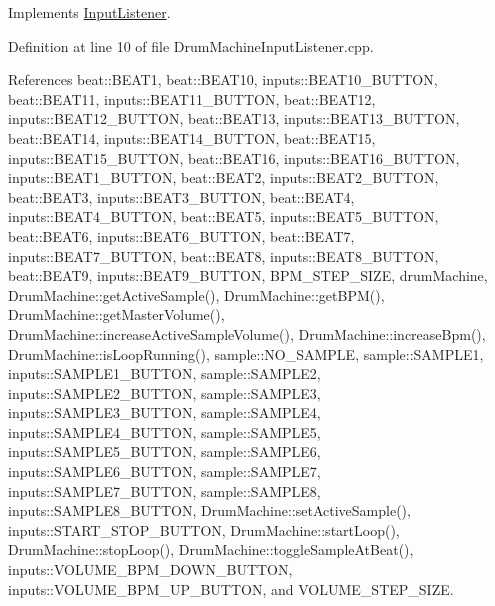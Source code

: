 Implements \hyperlink{class_input_listener_a1a3d74f2ffc108c773511ea4be250f7d}{Input\+Listener}.



Definition at line 10 of file Drum\+Machine\+Input\+Listener.\+cpp.



References beat\+::\+B\+E\+A\+T1, beat\+::\+B\+E\+A\+T10, inputs\+::\+B\+E\+A\+T10\+\_\+\+B\+U\+T\+T\+ON, beat\+::\+B\+E\+A\+T11, inputs\+::\+B\+E\+A\+T11\+\_\+\+B\+U\+T\+T\+ON, beat\+::\+B\+E\+A\+T12, inputs\+::\+B\+E\+A\+T12\+\_\+\+B\+U\+T\+T\+ON, beat\+::\+B\+E\+A\+T13, inputs\+::\+B\+E\+A\+T13\+\_\+\+B\+U\+T\+T\+ON, beat\+::\+B\+E\+A\+T14, inputs\+::\+B\+E\+A\+T14\+\_\+\+B\+U\+T\+T\+ON, beat\+::\+B\+E\+A\+T15, inputs\+::\+B\+E\+A\+T15\+\_\+\+B\+U\+T\+T\+ON, beat\+::\+B\+E\+A\+T16, inputs\+::\+B\+E\+A\+T16\+\_\+\+B\+U\+T\+T\+ON, inputs\+::\+B\+E\+A\+T1\+\_\+\+B\+U\+T\+T\+ON, beat\+::\+B\+E\+A\+T2, inputs\+::\+B\+E\+A\+T2\+\_\+\+B\+U\+T\+T\+ON, beat\+::\+B\+E\+A\+T3, inputs\+::\+B\+E\+A\+T3\+\_\+\+B\+U\+T\+T\+ON, beat\+::\+B\+E\+A\+T4, inputs\+::\+B\+E\+A\+T4\+\_\+\+B\+U\+T\+T\+ON, beat\+::\+B\+E\+A\+T5, inputs\+::\+B\+E\+A\+T5\+\_\+\+B\+U\+T\+T\+ON, beat\+::\+B\+E\+A\+T6, inputs\+::\+B\+E\+A\+T6\+\_\+\+B\+U\+T\+T\+ON, beat\+::\+B\+E\+A\+T7, inputs\+::\+B\+E\+A\+T7\+\_\+\+B\+U\+T\+T\+ON, beat\+::\+B\+E\+A\+T8, inputs\+::\+B\+E\+A\+T8\+\_\+\+B\+U\+T\+T\+ON, beat\+::\+B\+E\+A\+T9, inputs\+::\+B\+E\+A\+T9\+\_\+\+B\+U\+T\+T\+ON, B\+P\+M\+\_\+\+S\+T\+E\+P\+\_\+\+S\+I\+ZE, drum\+Machine, Drum\+Machine\+::get\+Active\+Sample(), Drum\+Machine\+::get\+B\+P\+M(), Drum\+Machine\+::get\+Master\+Volume(), Drum\+Machine\+::increase\+Active\+Sample\+Volume(), Drum\+Machine\+::increase\+Bpm(), Drum\+Machine\+::is\+Loop\+Running(), sample\+::\+N\+O\+\_\+\+S\+A\+M\+P\+LE, sample\+::\+S\+A\+M\+P\+L\+E1, inputs\+::\+S\+A\+M\+P\+L\+E1\+\_\+\+B\+U\+T\+T\+ON, sample\+::\+S\+A\+M\+P\+L\+E2, inputs\+::\+S\+A\+M\+P\+L\+E2\+\_\+\+B\+U\+T\+T\+ON, sample\+::\+S\+A\+M\+P\+L\+E3, inputs\+::\+S\+A\+M\+P\+L\+E3\+\_\+\+B\+U\+T\+T\+ON, sample\+::\+S\+A\+M\+P\+L\+E4, inputs\+::\+S\+A\+M\+P\+L\+E4\+\_\+\+B\+U\+T\+T\+ON, sample\+::\+S\+A\+M\+P\+L\+E5, inputs\+::\+S\+A\+M\+P\+L\+E5\+\_\+\+B\+U\+T\+T\+ON, sample\+::\+S\+A\+M\+P\+L\+E6, inputs\+::\+S\+A\+M\+P\+L\+E6\+\_\+\+B\+U\+T\+T\+ON, sample\+::\+S\+A\+M\+P\+L\+E7, inputs\+::\+S\+A\+M\+P\+L\+E7\+\_\+\+B\+U\+T\+T\+ON, sample\+::\+S\+A\+M\+P\+L\+E8, inputs\+::\+S\+A\+M\+P\+L\+E8\+\_\+\+B\+U\+T\+T\+ON, Drum\+Machine\+::set\+Active\+Sample(), inputs\+::\+S\+T\+A\+R\+T\+\_\+\+S\+T\+O\+P\+\_\+\+B\+U\+T\+T\+ON, Drum\+Machine\+::start\+Loop(), Drum\+Machine\+::stop\+Loop(), Drum\+Machine\+::toggle\+Sample\+At\+Beat(), inputs\+::\+V\+O\+L\+U\+M\+E\+\_\+\+B\+P\+M\+\_\+\+D\+O\+W\+N\+\_\+\+B\+U\+T\+T\+ON, inputs\+::\+V\+O\+L\+U\+M\+E\+\_\+\+B\+P\+M\+\_\+\+U\+P\+\_\+\+B\+U\+T\+T\+ON, and V\+O\+L\+U\+M\+E\+\_\+\+S\+T\+E\+P\+\_\+\+S\+I\+ZE.



